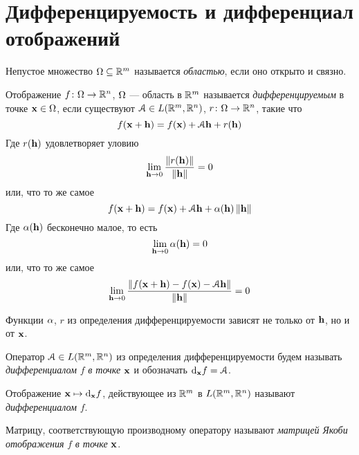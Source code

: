 \section{Дифференцируемость и дифференциал отображений}

\begin{definition}
    Непустое множество $\Omega \subseteq \mathbb{R}^m$ называется \textit{областью},
    если оно открыто и связно.
\end{definition}

\begin{definition}
    Отображение $f \colon \Omega \to \mathbb{R}^n$, $\Omega$ --- область в $\mathbb{R}^m$ называется
    \textit{дифференцируемым} в точке $\mathbf{x} \in \Omega$, если существуют $\mathcal{A} \in
    L(\mathbb{R}^m , \mathbb{R}^n)$, $r \colon \Omega \to \mathbb{R}^n$, такие что
\[
    f(\mathbf{x} + \mathbf{h}) = f(\mathbf{x}) + \mathcal{A} \mathbf{h} + r(\mathbf{h})
\]
    Где $r(\mathbf{h})$ удовлетворяет уловию
\[
    \lim_{\mathbf{h} \to 0}{\frac{\left\lVert r(\mathbf{h})\right\rVert}{\left\lVert\mathbf{h}\right\rVert}} = 0
\]
    или, что то же самое
\[
    f(\mathbf{x} + \mathbf{h}) = f(\mathbf{x}) + \mathcal{A} \mathbf{h} + \alpha(\mathbf{h})\left\lVert\mathbf{h}\right\rVert
\]
    Где $\alpha(\mathbf{h})$ бесконечно малое, то есть
\[
    \lim_{\mathbf{h} \to 0}{\alpha(\mathbf{h})} = 0
\]
    или, что то же самое
\[
    \lim_{\mathbf{h} \to 0}{\frac{\left\lVert f(\mathbf{x} + \mathbf{h}) - f(\mathbf{x}) - \mathcal{A} \mathbf{h}\right\rVert}{\left\lVert\mathbf{h}\right\rVert}} = 0
\]
\end{definition}

\begin{remark}
    Функции $\alpha$, $r$ из определения дифференцируемости зависят не только от $\mathbf{h}$,
    но и от $\mathbf{x}$.
\end{remark}

\begin{definition}
    Оператор $\mathcal{A} \in L(\mathbb{R}^m, \mathbb{R}^n)$ из определения дифференцируемости будем
    называть \textit{дифференциалом} $f$ \textit{в точке} $\mathbf{x}$ и обозначать
    $\mathrm{d}_{\mathbf{x}}{f} = \mathcal{A}$.
\end{definition}

\begin{remark}
    Отображение $\mathbf{x} \mapsto \mathrm{d}_{\mathbf{x}}{f}$, действующее из $\mathbb{R}^m$ в $L(\mathbb{R}^m, \mathbb{R}^n)$
    называют \textit{дифференциалом} $f$.
\end{remark}

\begin{definition}
    Матрицу, соответствующую производному оператору называют \textit{матрицей
    Якоби отображения} $f$ \textit{в точке} $\mathbf{x}$.
\end{definition}

